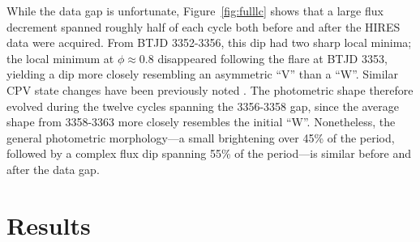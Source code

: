\documentclass[11pt,twocolumn,tighten,linenumbers]{aastex7}
\begin{document}
While the data gap is unfortunate, Figure~\ref{fig:fulllc} shows
that a large flux decrement spanned roughly half of each
cycle both before and after the HIRES data were acquired.  From BTJD
3352-3356, this dip had two sharp local minima;  the local minimum
at $\phi$$\approx$0.8 disappeared following the flare at BTJD 3353,
yielding a dip more closely resembling an asymmetric ``V'' than a ``W''.
Similar CPV state changes have been previously noted 
\citep{Stauffer2017,Bouma2024}.  The photometric shape therefore
evolved during the twelve cycles spanning the 3356-3358 gap, since
the average shape from 3358-3363 more closely resembles the initial
``W''.  Nonetheless, the general photometric morphology---a small
brightening over 45\% of the period, followed by a complex flux dip
spanning 55\% of the period---is similar before and after the data
gap.


\section{Results}
\label{sec:results}
\end{document}
